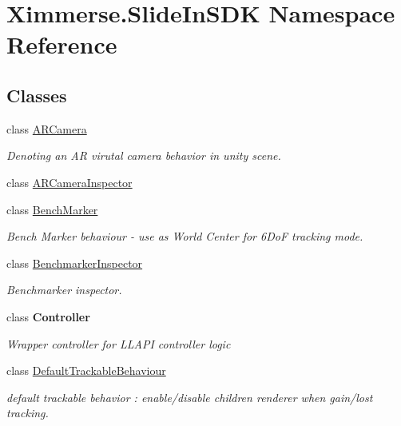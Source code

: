 \hypertarget{namespace_ximmerse_1_1_slide_in_s_d_k}{}\section{Ximmerse.\+Slide\+In\+S\+DK Namespace Reference}
\label{namespace_ximmerse_1_1_slide_in_s_d_k}
\subsection*{Classes}
\begin{DoxyCompactItemize}
\item 
class \mbox{\hyperlink{class_ximmerse_1_1_slide_in_s_d_k_1_1_a_r_camera}{A\+R\+Camera}}
\begin{DoxyCompactList}\small\item\em Denoting an AR virutal camera behavior in unity scene. \end{DoxyCompactList}\item 
class \mbox{\hyperlink{class_ximmerse_1_1_slide_in_s_d_k_1_1_a_r_camera_inspector}{A\+R\+Camera\+Inspector}}
\item 
class \mbox{\hyperlink{class_ximmerse_1_1_slide_in_s_d_k_1_1_bench_marker}{Bench\+Marker}}
\begin{DoxyCompactList}\small\item\em Bench Marker behaviour -\/ use as World Center for 6\+DoF tracking mode. \end{DoxyCompactList}\item 
class \mbox{\hyperlink{class_ximmerse_1_1_slide_in_s_d_k_1_1_benchmarker_inspector}{Benchmarker\+Inspector}}
\begin{DoxyCompactList}\small\item\em Benchmarker inspector. \end{DoxyCompactList}\item 
class {\bfseries Controller}
\begin{DoxyCompactList}\small\item\em Wrapper controller for L\+L\+A\+PI controller logic \end{DoxyCompactList}\item 
class \mbox{\hyperlink{class_ximmerse_1_1_slide_in_s_d_k_1_1_default_trackable_behaviour}{Default\+Trackable\+Behaviour}}
\begin{DoxyCompactList}\small\item\em default trackable behavior \+: enable/disable children renderer when gain/lost tracking. \end{DoxyCompactList}\item 

\end{DoxyCompactItemize}
